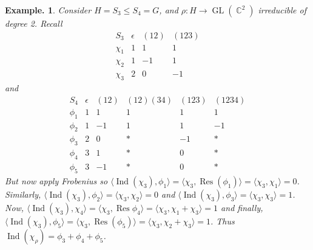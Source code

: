 \documentclass[11pt, a4paper]{memoir}
\DeclareMathOperator{\C}{{\mathbb{C}}}
\theoremstyle{change}
\theoremstyle{plain}
\theoremstyle{nonumberplain}
\newtheorem{example}{Example.}
\DeclareMathOperator{\GL}{GL}
\DeclareMathOperator{\Res}{Res}
\DeclareMathOperator{\Ind}{Ind}
\numberwithin{equation}{section}
\begin{document}
\begin{example}
    Consider $H=S_3\leq S_4=G$, and $\rho:H\to\GL(\C^2)$ irreducible of degree 2.
    Recall
    \begin{equation*}
        \begin{array}{c|ccc}
            S_3 & \epsilon & (12) & (123)\\
            \chi_1 & 1 & 1 & 1\\
            \chi_2 & 1 & -1 & 1\\
            \chi_3 & 2 & 0 & -1
        \end{array}
    \end{equation*}
    and
    \begin{equation*}
        \begin{array}{c|ccccc}
            S_4 & \epsilon & (12) & (12)(34) & (123) & (1234)\\
            \phi_1 & 1 & 1 & 1 & 1 & 1\\
            \phi_2 & 1 & -1 & 1 & 1 & -1\\
            \phi_3 & 2 & 0 &* & -1&*\\
            \phi_4 & 3 & 1 &* & 0&*\\
            \phi_5 & 3 & -1 &* & 0&*
        \end{array}
    \end{equation*}
    But now apply Frobenius so $\langle\Ind(\chi_3),\phi_1\rangle=\langle\chi_3,\Res(\phi_1)\rangle=\langle\chi_3,\chi_1\rangle=0$.
    Similarly, $\langle\Ind(\chi_3),\phi_2\rangle=\langle\chi_3,\chi_2\rangle=0$ and $\langle\Ind(\chi_3),\phi_3\rangle=\langle\chi_3,\chi_3\rangle=1$.
    Now, $\langle\Ind(\chi_3),\chi_4\rangle=\langle\chi_3,\Res\phi_4\rangle=\langle\chi_3,\chi_1+\chi_3\rangle=1$ and finally, $\langle\Ind(\chi_3),\phi_5\rangle=\langle\chi_3,\Res(\phi_5)\rangle=\langle\chi_3,\chi_2+\chi_3\rangle=1$.
    Thus $\Ind(\chi_\rho)=\phi_3+\phi_4+\phi_5$.
\end{example}
\end{document}
